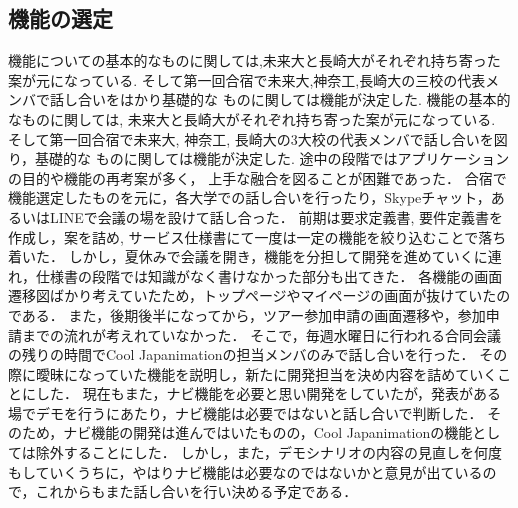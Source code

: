 \subsection{機能の選定}
\par
機能についての基本的なものに関しては,未来大と長崎大がそれぞれ持ち寄った案が元になっている. 
そして第一回合宿で未来大,神奈工,長崎大の三校の代表メンバで話し合いをはかり基礎的な
ものに関しては機能が決定した.
機能の基本的なものに関しては, 未来大と長崎大がそれぞれ持ち寄った案が元になっている.
そして第一回合宿で未来大, 神奈工, 長崎大の3大校の代表メンバで話し合いを図り，基礎的な
ものに関しては機能が決定した. 途中の段階ではアプリケーションの目的や機能の再考案が多く，
上手な融合を図ることが困難であった．
合宿で機能選定したものを元に，各大学での話し合いを行ったり，Skypeチャット，あるいはLINEで会議の場を設けて話し合った．
前期は要求定義書, 要件定義書を作成し，案を詰め, サービス仕様書にて一度は一定の機能を絞り込むことで落ち着いた．
しかし，夏休みで会議を開き，機能を分担して開発を進めていくに連れ，仕様書の段階では知識がなく書けなかった部分も出てきた．
各機能の画面遷移図ばかり考えていたため，トップページやマイページの画面が抜けていたのである．
また，後期後半になってから，ツアー参加申請の画面遷移や，参加申請までの流れが考えれていなかった．
そこで，毎週水曜日に行われる合同会議の残りの時間でCool Japanimationの担当メンバのみで話し合いを行った．
その際に曖昧になっていた機能を説明し，新たに開発担当を決め内容を詰めていくことにした．
現在もまた，ナビ機能を必要と思い開発をしていたが，発表がある場でデモを行うにあたり，ナビ機能は必要ではないと話し合いで判断した．
そのため，ナビ機能の開発は進んではいたものの，Cool Japanimationの機能としては除外することにした．
しかし，また，デモシナリオの内容の見直しを何度もしていくうちに，やはりナビ機能は必要なのではないかと意見が出ているので，これからもまた話し合いを行い決める予定である．
